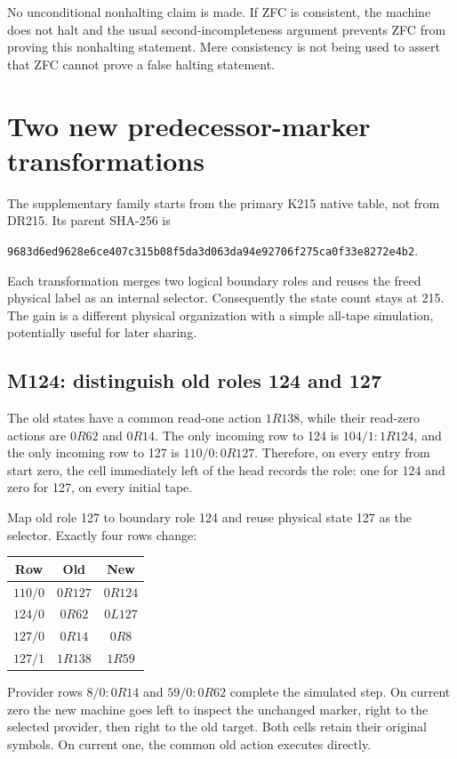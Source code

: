 \documentclass[11pt,a4paper]{article}
\theoremstyle{definition}
\numberwithin{equation}{section}
\begin{document}
No unconditional nonhalting claim is made. If ZFC is consistent, the
machine does not halt and the usual second-incompleteness argument
prevents ZFC from proving this nonhalting statement. Mere consistency is
not being used to assert that ZFC cannot prove a false halting statement.

\section{Two new predecessor-marker transformations}
\label{sec:markers}

The supplementary family starts from the primary K215 native table,
not from DR215. Its parent SHA-256 is
\begin{center}\small
\texttt{9683d6ed9628e6ce407c315b08f5da3d063da94e92706f275ca0f33e8272e4b2}.
\end{center}
Each transformation merges two logical boundary roles and reuses the
freed physical label as an internal selector. Consequently the state
count stays at 215. The gain is a different physical organization with
a simple all-tape simulation, potentially useful for later sharing.

\subsection{M124: distinguish old roles 124 and 127}

The old states have a common read-one action $1R138$, while their
read-zero actions are $0R62$ and $0R14$. The only incoming row to
124 is $104/1:1R124$, and the only incoming row to 127 is
$110/0:0R127$. Therefore, on every entry from start zero, the cell
immediately left of the head records the role: one for 124 and zero
for 127, on every initial tape.

Map old role 127 to boundary role 124 and reuse physical state 127 as
the selector. Exactly four rows change:
\begin{center}
\begin{tabular}{ccc}
\toprule
Row & Old & New\\
\midrule
$110/0$ & $0R127$ & $0R124$\\
$124/0$ & $0R62$ & $0L127$\\
$127/0$ & $0R14$ & $0R8$\\
$127/1$ & $1R138$ & $1R59$\\
\bottomrule
\end{tabular}
\end{center}
Provider rows $8/0:0R14$ and $59/0:0R62$ complete the simulated
step. On current zero the new machine goes left to inspect the
unchanged marker, right to the selected provider, then right to the
old target. Both cells retain their original symbols. On current one,
the common old action executes directly.
\end{document}
